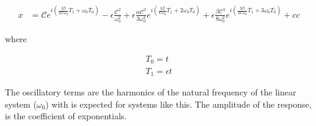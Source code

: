 %
\begin{align}\label{eq:x}
	x &= 
	\mathcal{C} e^{i \left( \frac{3 \beta}{2 \mathcal{C} \omega_0} T_1 + \omega_0 T_0 \right)}
	- \epsilon \frac{\mathcal{C}^2}{\omega_0^2}
	+ \epsilon \frac{\alpha \mathcal{C}^2}{3\omega_0^2} e^{i \left(\frac{3 \beta}{\mathcal{C} \omega_0} T_1 + 2\omega_0 T_0\right)}
	+ \epsilon \frac{\beta \mathcal{C}^3}{8\omega_0^2} e^{i \left( \frac{9 \beta}{2 \mathcal{C} \omega_0} T_1 + 3\omega_0 T_0 \right)} + cc
\end{align}
%

where

%
\begin{align*}
	T_0 = t \\
	T_1 = \epsilon t
\end{align*}
%

The oscillatory terms are the harmonics of the natural frequency of the linear system ($\omega_0$) with is expected for systems like this. The amplitude of the response, is the coefficient of exponentials. 
